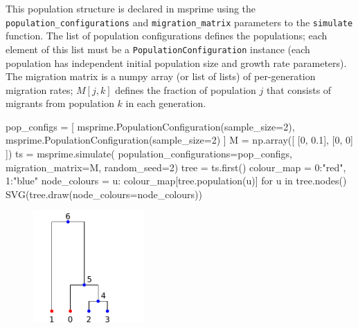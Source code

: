 \documentclass[graybox]{svmult}
\newcommand{\includenbimage}[1]{\begin{center}\texttt{[image: \#1]}\end{center}}
\begin{document}
This population structure is declared in msprime using the
\texttt{population\_configurations} and \texttt{migration\_matrix}
parameters to the \texttt{simulate} function. The list of population
configurations defines the populations; each element of this list must
be a \texttt{PopulationConfiguration} instance (each population has
independent initial population size and growth rate parameters). The
migration matrix is a numpy array (or list of lists) of per-generation
migration rates; \(M[j,k]\) defines the fraction of population \(j\)
that consists of migrants from population \(k\) in each generation.

\begin{pythoncode}
pop_configs = [
    msprime.PopulationConfiguration(sample_size=2),
    msprime.PopulationConfiguration(sample_size=2)
]
M = np.array([
    [0, 0.1],
    [0, 0]
])
ts  = msprime.simulate(
    population_configurations=pop_configs, migration_matrix=M,
    random_seed=2)
tree = ts.first()
colour_map = {0:"red", 1:"blue"}
node_colours = {
    u: colour_map[tree.population(u)] for u in tree.nodes()}
SVG(tree.draw(node_colours=node_colours))
\end{pythoncode}

\begin{figure}
  \begin{center}
    \includegraphics[width=0.38\textwidth]{images/simulations_26_0.pdf}
  \end{center}
\end{figure}
%
\end{document}
